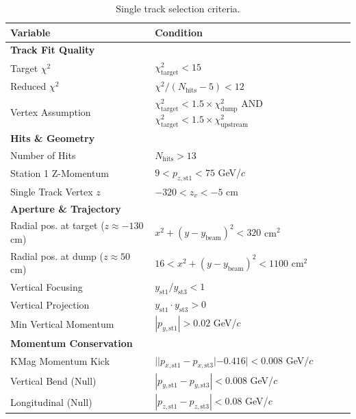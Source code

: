 \documentclass[11pt]{article}
\begin{document}
\begin{table}[!ht]
    \centering
    \caption{Single track selection criteria.}
    \label{tab:single_track_cuts}
    \begin{tabular}{@{}ll@{}}
        \toprule
        \textbf{Variable} & \textbf{Condition} \\ 
        \midrule
        \textbf{Track Fit Quality} & \\
        Target $\chi^2$ & $\chi^2_{\text{target}} < 15$ \\
        Reduced $\chi^2$ & $\chi^2 / (N_{\text{hits}} - 5) < 12$ \\
        Vertex Assumption & $\chi^2_{\text{target}} < 1.5 \times \chi^2_{\text{dump}}$ AND $\chi^2_{\text{target}} < 1.5 \times \chi^2_{\text{upstream}}$ \\
        \midrule
        \textbf{Hits \& Geometry} & \\
        Number of Hits & $N_{\text{hits}} > 13$ \\
        Station 1 Z-Momentum & $9 < p_{z, \text{st1}} < 75$ GeV/$c$ \\
        Single Track Vertex $z$ & $-320 < z_{v} < -5$ cm \\
        \midrule
        \textbf{Aperture \& Trajectory} & \\
        Radial pos. at target ($z \approx -130$ cm) & $x^2 + (y-y_{\text{beam}})^2 < 320$ cm$^2$ \\
        Radial pos. at dump ($z \approx 50$ cm) & $16 < x^2 + (y-y_{\text{beam}})^2 < 1100$ cm$^2$ \\
        Vertical Focusing & $y_{\text{st1}} / y_{\text{st3}} < 1$ \\
        Vertical Projection & $y_{\text{st1}} \cdot y_{\text{st3}} > 0$ \\
        Min Vertical Momentum & $|p_{y, \text{st1}}| > 0.02$ GeV/$c$ \\
        \midrule
        \textbf{Momentum Conservation} & \\
        KMag Momentum Kick & $||p_{x, \text{st1}} - p_{x, \text{st3}}| - 0.416| < 0.008$ GeV/$c$ \\
        Vertical Bend (Null) & $|p_{y, \text{st1}} - p_{y, \text{st3}}| < 0.008$ GeV/$c$ \\
        Longitudinal (Null) & $|p_{z, \text{st1}} - p_{z, \text{st3}}| < 0.08$ GeV/$c$ \\
        \bottomrule
    \end{tabular}
\end{table}
\end{document}
